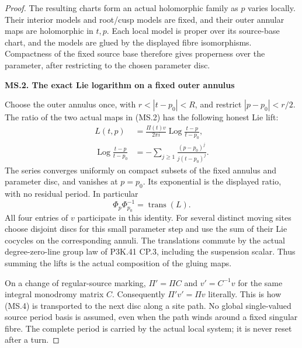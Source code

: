 \begin{proof}
The resulting charts form an actual holomorphic family as \(p\)
varies locally. Their interior models and root/cusp models are fixed,
and their outer annular maps are holomorphic in \(t,p\). Each local model is proper over its source-base chart, and the
models are glued by the displayed fibre isomorphisms. Compactness of
the fixed source base therefore gives properness over the parameter,
after restricting to the chosen parameter disc.

\par

\medskip\noindent\textbf{MS.2. The exact Lie logarithm on a fixed outer annulus}

\par\nobreak

Choose the outer annulus once, with
\(r<|t-p_0|<R\), and restrict \(|p-p_0|<r/2\). The ratio of
the two actual maps in (MS.2) has the following honest Lie lift:
\[
 \begin{split}
 L(t,p)&=\frac{\Pi(t)v}{2\pi i}
                   \operatorname{Log}\frac{t-p}{t-p_0},\\
 \operatorname{Log}\frac{t-p}{t-p_0}
       &=-\sum_{j\geq1}\frac{(p-p_0)^j}{j(t-p_0)^j}.
 \end{split}                                             \tag{MS.4}
\]
The series converges uniformly on compact subsets of the fixed annulus
and parameter disc, and vanishes at \(p=p_0\). Its exponential is
the displayed ratio, with no residual period. In particular
\[
       \Phi_p\Phi_{p_0}^{-1}=\operatorname{trans}(L).      \tag{MS.5}
\]
All four entries of \(v\) participate in this identity. For several
distinct moving sites choose disjoint discs for this small parameter
step and use the sum of their Lie cocycles on the corresponding
annuli. The translations commute by the actual degree-zero-line group
law of P3K.41 CP.3, including the suspension scalar. Thus summing the
lifts is the actual composition of the gluing maps.

On a change of regular-source marking, \(\Pi' =\Pi C\) and
\(v'=C^{-1}v\) for the same integral monodromy matrix \(C\).
Consequently \(\Pi'v'=\Pi v\) literally. This is how (MS.4)
is transported to the next disc along a site path. No global
single-valued source period basis is assumed, even when the path
winds around a fixed singular fibre. The complete period is carried
by the actual local system; it is never reset after a turn.

\par


\end{proof}
